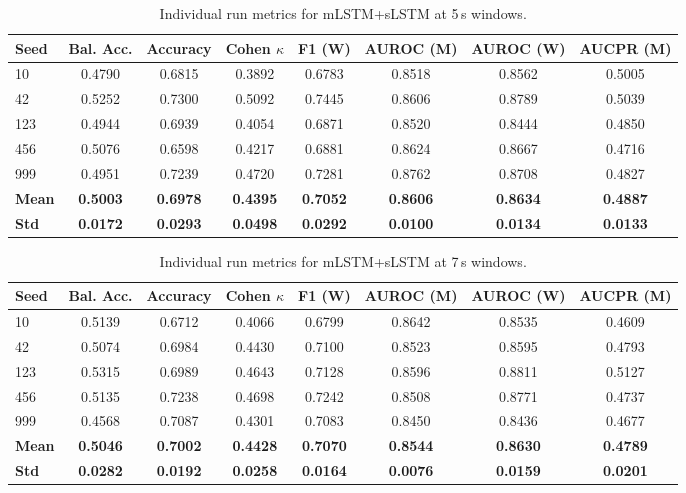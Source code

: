 \begin{table}[htbp]
\centering
\caption{Individual run metrics for mLSTM+sLSTM at 5\,s windows.}
\label{tab:app_metrics_combined_5s}
\footnotesize
\setlength{\tabcolsep}{2.5pt}
\begin{tabular}{l | c | c | c | c | c | c | c}
\textbf{Seed} & \textbf{Bal. Acc.} & \textbf{Accuracy} & \textbf{Cohen \(\kappa\)} & \textbf{F1 (W)} & \textbf{AUROC (M)} & \textbf{AUROC (W)} & \textbf{AUCPR (M)} \\
\hline
10  & 0.4790 & 0.6815 & 0.3892 & 0.6783 & 0.8518 & 0.8562 & 0.5005 \\
42  & 0.5252 & 0.7300 & 0.5092 & 0.7445 & 0.8606 & 0.8789 & 0.5039 \\
123 & 0.4944 & 0.6939 & 0.4054 & 0.6871 & 0.8520 & 0.8444 & 0.4850 \\
456 & 0.5076 & 0.6598 & 0.4217 & 0.6881 & 0.8624 & 0.8667 & 0.4716 \\
999 & 0.4951 & 0.7239 & 0.4720 & 0.7281 & 0.8762 & 0.8708 & 0.4827 \\
\hline
\textbf{Mean} & \textbf{0.5003} & \textbf{0.6978} & \textbf{0.4395} & \textbf{0.7052} & \textbf{0.8606} & \textbf{0.8634} & \textbf{0.4887} \\
\textbf{Std} & \textbf{0.0172} & \textbf{0.0293} & \textbf{0.0498} & \textbf{0.0292} & \textbf{0.0100} & \textbf{0.0134} & \textbf{0.0133} \\
\hline
\end{tabular}
\setlength{\tabcolsep}{6pt}
\end{table}

\begin{table}[htbp]
\centering
\caption{Individual run metrics for mLSTM+sLSTM at 7\,s windows.}
\label{tab:app_metrics_combined_7s}
\footnotesize
\setlength{\tabcolsep}{2.5pt}
\begin{tabular}{l | c | c | c | c | c | c | c}
\textbf{Seed} & \textbf{Bal. Acc.} & \textbf{Accuracy} & \textbf{Cohen \(\kappa\)} & \textbf{F1 (W)} & \textbf{AUROC (M)} & \textbf{AUROC (W)} & \textbf{AUCPR (M)} \\
\hline
10  & 0.5139 & 0.6712 & 0.4066 & 0.6799 & 0.8642 & 0.8535 & 0.4609 \\
42  & 0.5074 & 0.6984 & 0.4430 & 0.7100 & 0.8523 & 0.8595 & 0.4793 \\
123 & 0.5315 & 0.6989 & 0.4643 & 0.7128 & 0.8596 & 0.8811 & 0.5127 \\
456 & 0.5135 & 0.7238 & 0.4698 & 0.7242 & 0.8508 & 0.8771 & 0.4737 \\
999 & 0.4568 & 0.7087 & 0.4301 & 0.7083 & 0.8450 & 0.8436 & 0.4677 \\
\hline
\textbf{Mean} & \textbf{0.5046} & \textbf{0.7002} & \textbf{0.4428} & \textbf{0.7070} & \textbf{0.8544} & \textbf{0.8630} & \textbf{0.4789} \\
\textbf{Std} & \textbf{0.0282} & \textbf{0.0192} & \textbf{0.0258} & \textbf{0.0164} & \textbf{0.0076} & \textbf{0.0159} & \textbf{0.0201} \\
\hline
\end{tabular}
\setlength{\tabcolsep}{6pt}
\end{table}

